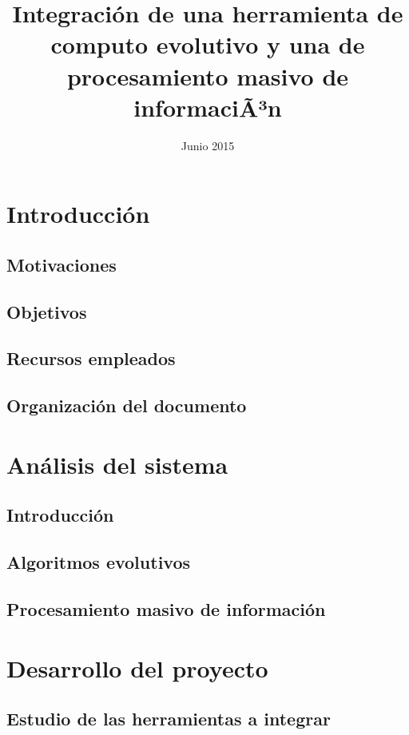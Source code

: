 \documentclass{memoriaPFC}
\title{Integración de una herramienta de computo evolutivo y una de procesamiento masivo de informaciÃ³n}
\date{Junio 2015}
\begin{document}
\frontmatter
\hacerportada
\hacercontraportada
\newpage{\ }
\thispagestyle{empty} 
\hacerprologo
\haceragradecimientos
\setcounter{secnumdepth}{2}
\setcounter{tocdepth}{2}
\tableofcontents
\listoffigures
\listoftables

\mainmatter

\chapter{Introducci\'on}
	\section{Motivaciones}
		
	\section{Objetivos}
	\section{Recursos empleados}
	\section{Organizaci\'on del documento}

\chapter{An\'alisis del sistema}
	\section{Introducci\'on}
	\section{Algoritmos evolutivos}
		
	\section{Procesamiento masivo de informaci\'on}
		

\chapter{Desarrollo del proyecto}
	\section{Estudio de las herramientas a integrar}
\end{document}
